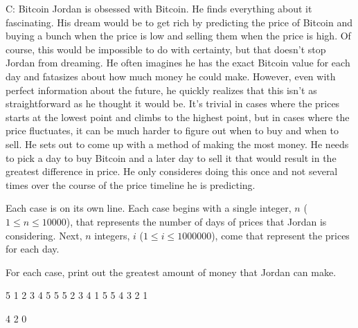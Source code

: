 \begin{problem}{C: Bitcoin}
Jordan is obsessed with Bitcoin. He finds everything about it fascinating. 
His dream would be to get rich by predicting the price of Bitcoin and buying a bunch when the price is low and selling them when the price is high.
Of course, this would be impossible to do with certainty, but that doesn't stop Jordan from dreaming.
He often imagines he has the exact Bitcoin value for each day and fatasizes about how much money he could make.
However, even with perfect information about the future, he quickly realizes that this isn't as straightforward as he thought it would be.
It's trivial in cases where the prices starts at the lowest point and climbs to the highest point, but in cases where the price fluctuates, it can be much harder to figure out when to buy and when to sell. 
He sets out to come up with a method of making the most money. 
He needs to pick a day to buy Bitcoin and a later day to sell it that would result in the greatest difference in price.
He only consideres doing this once and not several times over the course of the price timeline he is predicting.
\end{problem}

\begin{formalin}
Each case is on its own line.
Each case begins with a single integer, $n$ ($1 \leq n \leq 10000$), that represents the number of days of prices that Jordan is considering. 
Next, $n$ integers, $i$ ($1 \leq i \leq 1000000$), come that represent the prices for each day.
\end{formalin}

\begin{formalout}
For each case, print out the greatest amount of money that Jordan can make.
\end{formalout}

\begin{datain}
5 1 2 3 4 5
5 5 2 3 4 1
5 5 4 3 2 1
\end{datain}

\begin{dataout}
4
2
0
\end{dataout}

